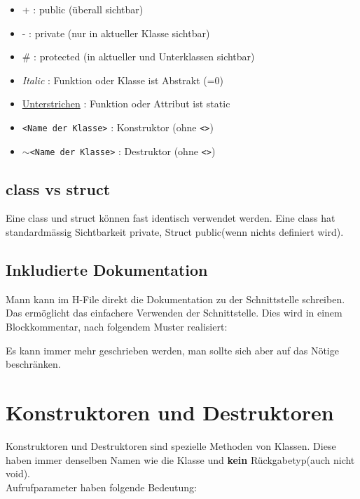 \begin{itemize}[itemsep=1pt, parsep=0pt]
    \item + : public (überall sichtbar)
    \item - : private (nur in  aktueller Klasse sichtbar)
    \item \# : protected (in aktueller und Unterklassen sichtbar)
    \item \textit{Italic} : Funktion oder Klasse ist Abstrakt (=0)
    \item \underline{Unterstrichen} : Funktion oder Attribut ist static
    \item \verb|<Name der Klasse>| :  Konstruktor (ohne \verb|<>|)
    \item $\sim$\verb|<Name der Klasse>| : Destruktor (ohne \verb|<>|)
\end{itemize}



\subsection{class vs struct}

Eine class und struct können fast identisch verwendet werden. 
Eine class hat standardmässig Sichtbarkeit private, Struct public(wenn nichts definiert wird).

\subsection{Inkludierte Dokumentation}

Mann kann im H-File direkt die Dokumentation zu der Schnittstelle schreiben. 
Das ermöglicht das einfachere Verwenden der Schnittstelle.
Dies wird in einem Blockkommentar, nach folgendem Muster realisiert:



Es kann immer mehr geschrieben werden, man sollte sich aber auf das Nötige beschränken.

\section{Konstruktoren und Destruktoren}

Konstruktoren und Destruktoren sind spezielle Methoden von Klassen. 
Diese haben immer denselben Namen wie die Klasse und \textbf{kein} Rückgabetyp(auch nicht void).\\
Aufrufparameter haben folgende Bedeutung:

